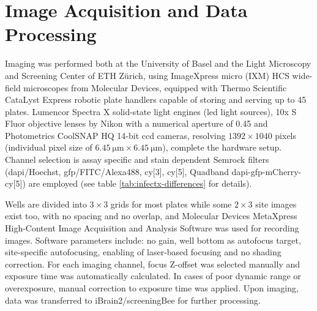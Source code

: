 \section{Image Acquisition and Data Processing}
Imaging was performed both at the University of Basel and the Light Microscopy and Screening Center of ETH Z\"urich, using ImageXpress micro (IXM) HCS wide-field microscopes from Molecular Devices, equipped with Thermo Scientific CataLyst Express robotic plate handlers capable of storing and serving up to 45 plates. Lumencor Spectra X solid-state light engines (\acrshort{led} light sources), 10x S Fluor objective lenses by Nikon with a numerical aperture of 0.45 and Photometrics CoolSNAP HQ 14-bit \acrshort{ccd} cameras, resolving $1392 \times 1040$ pixels (individual pixel size of $\SI{6.45}{\micro\meter} \times \SI{6.45}{\micro\meter}$), complete the hardware setup. Channel selection is assay specific and stain dependent Semrock filters (\acrshort{dapi}\slash Hoechst, \acrshort{gfp}\slash FITC\slash Alexa488, \acrshort{cy}[3], \acrshort{cy}[5], Quadband \acrshort{dapi}-\acrshort{gfp}-mCherry-\acrshort{cy}[5]) are employed (see table \ref{tab:infectx-differences} for details).

Wells are divided into $3 \times 3$ grids for most plates while some $2 \times 3$ site images exist too, with no spacing and no overlap, and Molecular Devices MetaXpress High-Content Image Acquisition and Analysis Software was used for recording images. Software parameters include: no gain, well bottom as autofocus target, site-specific autofocusing, enabling of laser-based focusing and no shading correction. For each imaging channel, focus Z-offset was selected manually and exposure time was automatically calculated. In cases of poor dynamic range or overexposure, manual correction to exposure time was applied. Upon imaging, data was transferred to iBrain2\slash screeningBee \citep{Rouilly2012} for further processing.

